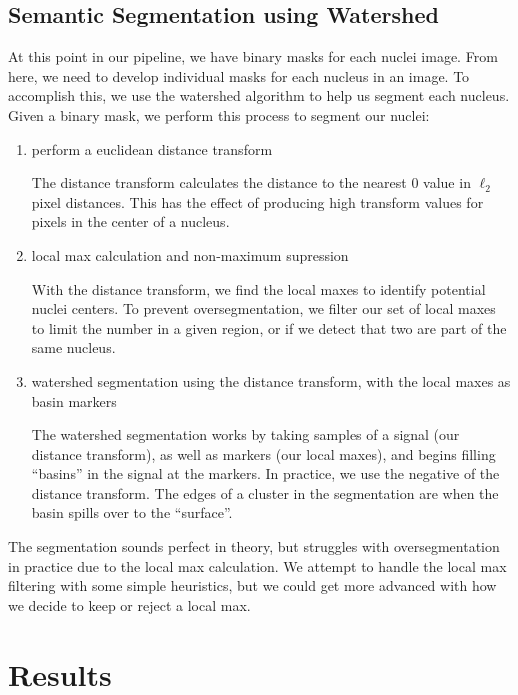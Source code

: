 \documentclass[paper=letter, fontsize=12pt]{article}
\numberwithin{equation}{section} %
\numberwithin{figure}{section} %
\numberwithin{table}{section} %
\begin{document}
\subsection{Semantic Segmentation using Watershed}

At this point in our pipeline, we have binary masks for each nuclei image.
From here, we need to develop individual masks for each nucleus in an image.
To accomplish this, we use the watershed algorithm to help us segment each
nucleus.  Given a binary mask, we perform this process to segment our nuclei:
\begin{enumerate}
    \item perform a euclidean distance transform

        The distance transform calculates the distance to the nearest 0 value
        in $\ell_2$ pixel distances.  This has the effect of producing high
        transform values for pixels in the center of a nucleus.

    \item local max calculation and non-maximum supression

        With the distance transform, we find the local maxes to identify
        potential nuclei centers.  To prevent oversegmentation, we filter our
        set of local maxes to limit the number in a given region, or if we
        detect that two are part of the same nucleus.

    \item watershed segmentation using the distance transform, with the local
        maxes as basin markers

        The watershed segmentation works by taking samples of a signal (our
        distance transform), as well as markers (our local maxes), and begins
        filling ``basins'' in the signal at the markers.  In practice, we use
        the negative of the distance transform.  The edges of a cluster in the
        segmentation are when the basin spills over to the ``surface''.
\end{enumerate}

The segmentation sounds perfect in theory, but struggles with oversegmentation
in practice due to the local max calculation.  We attempt to handle the local
max filtering with some simple heuristics, but we could get more advanced with
how we decide to keep or reject a local max.

\section{Results}
\end{document}

